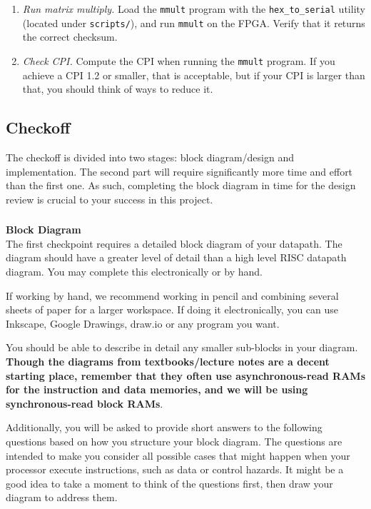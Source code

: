\documentclass[11pt]{article}
\begin{document}
\begin{enumerate}
  \item \textit{Run matrix multiply.} Load the \verb|mmult| program with the \verb|hex_to_serial| utility (located under \texttt{scripts/}), and run \verb|mmult| on the FPGA. Verify that it returns the correct checksum.
  \item \textit{Check CPI.} Compute the CPI when running the \verb|mmult| program. If you achieve a CPI 1.2 or smaller, that is acceptable, but if your CPI is larger than that, you should think of ways to reduce it.
\end{enumerate}

\subsection{Checkoff}
The checkoff is divided into two stages: block diagram/design and implementation.
The second part will require significantly more time and effort than the first one.
As such, completing the block diagram in time for the design review is crucial to your success in this project.

\subsubsection{\blockDiagramTaskName}
\textbf{Block Diagram}\\
The first checkpoint requires a detailed block diagram of your datapath.
The diagram should have a greater level of detail than a high level RISC datapath diagram.
You may complete this electronically or by hand.

If working by hand, we recommend working in pencil and combining several sheets of paper for a larger workspace.
If doing it electronically, you can use Inkscape, Google Drawings, draw.io or any program you want.

You should be able to describe in detail any smaller sub-blocks in your diagram.
\textbf{Though the diagrams from textbooks/lecture notes are a decent starting place, remember that they often use asynchronous-read RAMs for the instruction and data memories, and we will be using synchronous-read block RAMs}.

Additionally, you will be asked to provide short answers to the following questions based on how you structure your block diagram. The questions are intended to make you consider all possible cases that might happen when your processor execute instructions, such as data or control hazards. It might be a good idea to take a moment to think of the questions first, then draw your diagram to address them.
\end{document}
